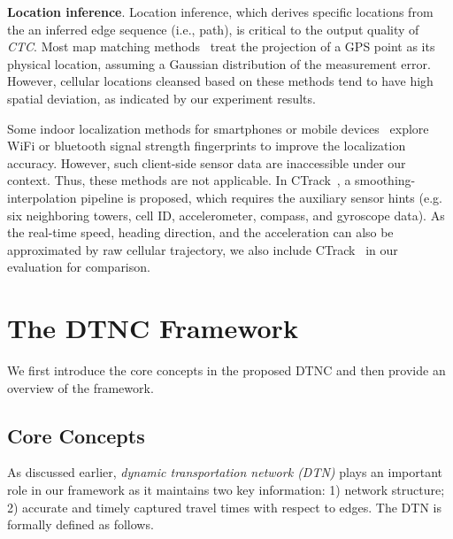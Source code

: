 \documentclass{vldb}
\begin{document}
	\noindent\textbf{Location inference}.
	Location inference, which derives specific locations from the an inferred edge sequence (i.e., path), is critical to the output quality of \textit{CTC}.
	Most map matching methods~\cite{wu2016only,hu2017if,yin2016general,wei2012fast,goh2012online,lou2009map,newson2009hidden} treat the projection of a GPS point as its physical location, assuming a Gaussian distribution of the measurement error.
	However, 
	cellular locations cleansed based on these methods tend to have high spatial deviation, as indicated by our experiment results. %
	
	
	Some indoor localization methods for smartphones or mobile devices~\cite{chen2015fusion,kang2015smartpdr} explore WiFi or bluetooth signal strength fingerprints to improve the localization accuracy.
	However, such client-side sensor data are inaccessible under our context. Thus, these methods are not applicable.
	In CTrack~\cite{thiagarajan2011accurate}, a smoothing-interpolation pipeline is proposed, which requires the auxiliary sensor hints (e.g. six neighboring towers, cell ID, accelerometer, compass, and gyroscope data).
	As the real-time speed, heading direction, and the acceleration can also be approximated by raw cellular trajectory, we also include CTrack~\cite{thiagarajan2011accurate} in our evaluation for comparison. 
	
	\section{The DTNC Framework}
	\label{sec:dtn-octc}
	
	We first introduce the core concepts in the proposed DTNC and then provide an overview of the framework.
	
	\vspace{-5pt}
	\subsection{Core Concepts}
	
	
	As discussed earlier, {\em dynamic transportation network (DTN)} plays an important role in our framework as it maintains two key information: 1) network structure; 2) accurate and timely captured travel times with respect to edges. The DTN is formally defined as follows.
	
\end{document}
